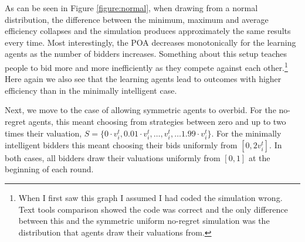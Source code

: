 \documentclass[12pt,twoside]{reedthesis}
\begin{document}
As can be seen in Figure \ref{figure:normal}, when drawing from a normal distribution, the difference between the minimum, maximum and average efficiency collapses and the simulation produces approximately the same results every time. Most interestingly, the POA decreases monotonically for the learning agents as the number of bidders increases. Something about this setup teaches people to bid more and more inefficiently as they compete against each other.\footnote{When I first saw this graph I assumed I had coded the simulation wrong. Text tools comparison showed the code was correct and the only difference between this and the symmetric uniform no-regret simulation was the distribution that agents draw their valuations from.} Here again we also see that the learning agents lead to outcomes with higher efficiency than in the minimally intelligent case.

Next, we move to the case of allowing symmetric agents to overbid. For the no-regret agents, this meant choosing from strategies between zero and up to two times their valuation, $S = \{0 \cdot v_i^t, 0.01 \cdot v_i^t, \ldots, v_i^t, \ldots 1.99 \cdot v_i^t\}$. For the minimally intelligent bidders this meant choosing their bids uniformly from $[0, 2v_i^t]$. In both cases, all bidders draw their valuations uniformly from $[0,1]$ at the beginning of each round.
\end{document}
